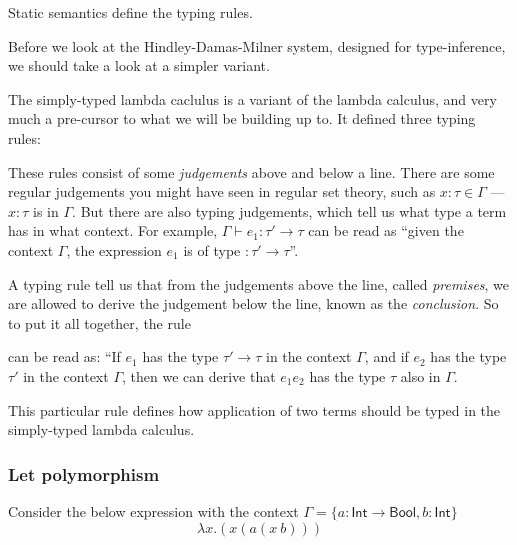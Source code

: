 Static semantics define the typing rules.

Before we look at the Hindley-Damas-Milner system, designed for
type-inference, we should take a look at a simpler variant.

The simply-typed lambda caclulus is a variant of the lambda
calculus, and very much a pre-cursor to what we will be building up
to. It defined three typing rules:
These rules consist of some \textit{judgements} above and below a line. There
are some regular judgements you might have seen in regular set theory,
such as $x : \tau \in \Gamma$ --- $x : \tau$ is in $\Gamma$. But there are also typing
judgements, which tell us what type a term has in what context. For
example, $\Gamma \vdash e_1 : \tau' \rightarrow \tau$ can be read as ``given the context
$\Gamma$, the expression $e_1$ is of type $:\tau' \rightarrow \tau$''.

A typing rule tell us that from the judgements above the line,
called \textit{premises}, we are allowed to derive the judgement
below the line, known as the \textit{conclusion}. So to put it all
together, the rule
\begin{mathpar}
\end{mathpar}
can be read as: ``If $e_1$ has the type $\tau' \rightarrow \tau$ in the context $\Gamma$,
and if $e_2$ has the type $\tau'$ in the context $\Gamma$, then we can derive
that $e_1 e_2$ has the type $\tau$ also in $\Gamma$.

This particular rule defines how application of two terms should be
typed in the simply-typed lambda calculus. 

\subsubsection{Let polymorphism}

Consider the below expression with the context $\Gamma = \{ a :
\textsf{Int} \rightarrow \textsf{Bool}, b : \textsf{Int} \}$
\[ \lambda x . (x (a (x \ b)))\]

